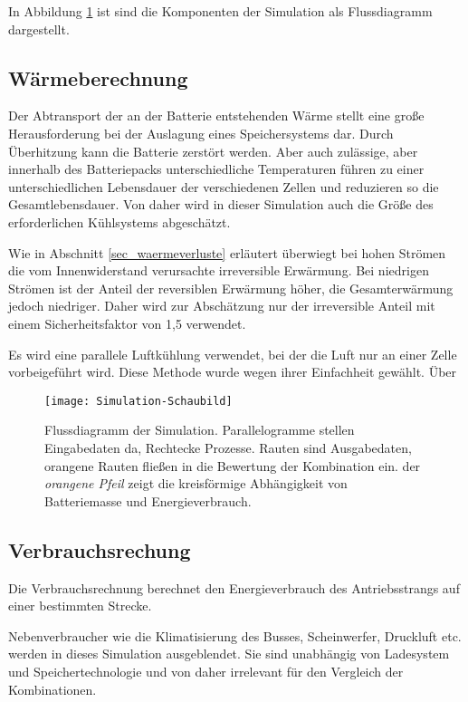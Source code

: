 In Abbildung \ref{abb_sim} ist sind die Komponenten der Simulation als Flussdiagramm dargestellt.

\subsection{Wärmeberechnung}
Der Abtransport der an der Batterie entstehenden Wärme stellt eine große Herausforderung bei der Auslagung eines Speichersystems dar. Durch Überhitzung kann die Batterie zerstört werden. Aber auch zulässige, aber innerhalb des Batteriepacks unterschiedliche Temperaturen führen zu einer unterschiedlichen Lebensdauer der verschiedenen Zellen und reduzieren so die Gesamtlebensdauer. Von daher wird in dieser Simulation auch die Größe des erforderlichen Kühlsystems abgeschätzt.

Wie in Abschnitt \ref{sec_waermeverluste} erläutert überwiegt bei hohen Strömen die vom Innenwiderstand verursachte irreversible Erwärmung. Bei niedrigen Strömen ist der Anteil der reversiblen Erwärmung höher, die Gesamterwärmung jedoch niedriger. Daher wird zur Abschätzung nur der irreversible Anteil mit einem Sicherheitsfaktor von 1,5 verwendet.

Es wird eine parallele Luftkühlung verwendet, bei der die Luft nur an einer Zelle vorbeigeführt wird. Diese Methode wurde wegen ihrer Einfachheit gewählt. Über 







\begin{figure}\centering
	\texttt{[image: Simulation-Schaubild]}
	\caption[Flussdiagramm der Simulation]{Flussdiagramm der Simulation. Parallelogramme stellen Eingabedaten da, Rechtecke Prozesse. Rauten sind Ausgabedaten, orangene Rauten fließen in die Bewertung der Kombination ein. der \emph{orangene Pfeil}  zeigt die kreisförmige Abhängigkeit von Batteriemasse und Energieverbrauch.}
	\label{abb_sim}
\end{figure}

\subsection{Verbrauchsrechung}
Die Verbrauchsrechnung berechnet den Energieverbrauch des Antriebsstrangs auf einer bestimmten Strecke.

Nebenverbraucher wie die Klimatisierung des Busses, Scheinwerfer, Druckluft etc. werden in dieses Simulation ausgeblendet. Sie sind unabhängig von Ladesystem und Speichertechnologie und von daher irrelevant für den Vergleich der Kombinationen.

